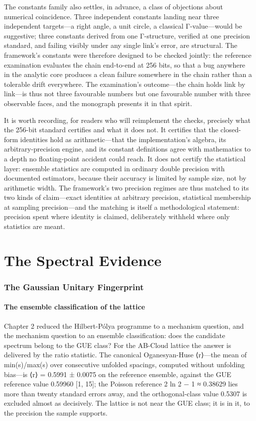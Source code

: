 \documentclass[10pt]{article}
\begin{document}
The constants family also settles, in advance, a class of objections about numerical coincidence. Three independent constants landing near three independent targets---a right angle, a unit circle, a classical Γ-value---would be suggestive; three constants derived from one Γ-structure, verified at one precision standard, and failing visibly under any single link's error, are structural. The framework's constants were therefore designed to be checked jointly: the reference examination evaluates the chain end-to-end at 256 bits, so that a bug anywhere in the analytic core produces a clean failure somewhere in the chain rather than a tolerable drift everywhere. The examination's outcome---the chain holds link by link---is thus not three favourable numbers but one favourable number with three observable faces, and the monograph presents it in that spirit.

It is worth recording, for readers who will reimplement the checks, precisely what the 256-bit standard certifies and what it does not. It certifies that the closed-form identities hold as arithmetic---that the implementation's algebra, its arbitrary-precision engine, and its constant definitions agree with mathematics to a depth no floating-point accident could reach. It does not certify the statistical layer: ensemble statistics are computed in ordinary double precision with documented estimators, because their accuracy is limited by sample size, not by arithmetic width. The framework's two precision regimes are thus matched to its two kinds of claim---exact identities at arbitrary precision, statistical membership at sampling precision---and the matching is itself a methodological statement: precision spent where identity is claimed, deliberately withheld where only statistics are meant.

\part*{The Spectral Evidence}
\section{The Gaussian Unitary Fingerprint}\label{sec:ch8}
\subsection{The ensemble classification of the lattice}\label{sec:81}
Chapter 2 reduced the Hilbert-Pólya programme to a mechanism question, and the mechanism question to an ensemble classification: does the candidate spectrum belong to the GUE class? For the AB-Cloud lattice the answer is delivered by the ratio statistic. The canonical Oganesyan-Huse ⟨r⟩---the mean of min(s)/max(s) over consecutive unfolded spacings, computed without unfolding bias---is ⟨r⟩ = 0.5991 ± 0.0075 on the reference ensemble, against the GUE reference value 0.59960 [1, 15]; the Poisson reference 2 ln 2 − 1 ≈ 0.38629 lies more than twenty standard errors away, and the orthogonal-class value 0.5307 is excluded almost as decisively. The lattice is not near the GUE class; it is in it, to the precision the sample supports.
\end{document}
